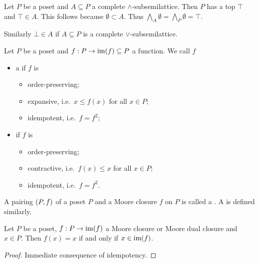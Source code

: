 \begin{note}
Let $P$ be a poset and $A\subseteq P$ a complete $\wedge$-subsemilattice. Then $P$ has a top $\top$ and $\top \in A$. This follows because $\emptyset \subset A$. Thus $\bigwedge_A \emptyset = \bigwedge_P \emptyset = \top$.

Similarly $\bot\in A$ if $A\subseteq P$ is a complete $\vee$-subsemilattice.
\end{note}

\begin{definition}
Let $P$ be a poset and $f: P\to \operatorname{im}(f) \subseteq P$ a function. We call $f$
\begin{itemize}
\item a  if $f$ is
\begin{itemize}
\item order-preserving;
\item expansive, i.e.\ $x \leq f(x)$ for all $x\in P$;
\item idempotent, i.e.\ $f = f^2$;
\end{itemize}
\item {} if $f$ is
\begin{itemize}
\item order-preserving;
\item contractive, i.e.\ $f(x) \leq x$ for all $x\in P$;
\item idempotent, i.e.\ $f = f^2$.
\end{itemize}
\end{itemize}
A pairing $\sSet{P,f}$ of a poset $P$ and a Moore closure $f$ on $P$ is called a . A  is defined similarly.
\end{definition}

\begin{lemma} \label{idempotencyMooreClosureLemma}
Let $P$ be a poset, $f: P\to \operatorname{im}(f)$ a Moore closure or Moore dual closure and $x\in P$. Then $f(x) = x$ \textup{if and only if} $x\in \operatorname{im}(f)$.
\end{lemma}
\begin{proof}
Immediate consequence of idempotency.
\end{proof}

